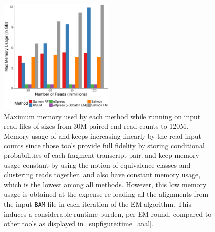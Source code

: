 \begin{figure}[h]
   \centering
   \includegraphics[width=0.5\textwidth]{Figures/DDFact/memory_sim}
   \caption[Maximum runtime of different methods]{Maximum memory used by each method 
   while running on input read files of sizes from 30M paired-end read counts to 120M. 
   Memory usage of \rsem and \salfm keeps increasing linearly by the read input counts 
   since those tools provide full fidelity by storing  conditional probabilities of 
   each fragment-transcript pair. \salmon and \salrf keep memory usage constant by using 
   the notion of equivalence classes and clustering reads together. \express and \expressEM 
   also have constant memory usage, which is the lowest among all methods.  However, this 
   low memory usage is obtained at the expense re-loading all the alignments from the input 
   \texttt{BAM} file in each iteration of the EM algorithm.  This induces a considerable 
   runtime burden, per EM-round, compared to other tools as displayed 
   in~\cref{supfigure:time_anal}.}
   \label{supfig:memory_anal}
\end{figure}

